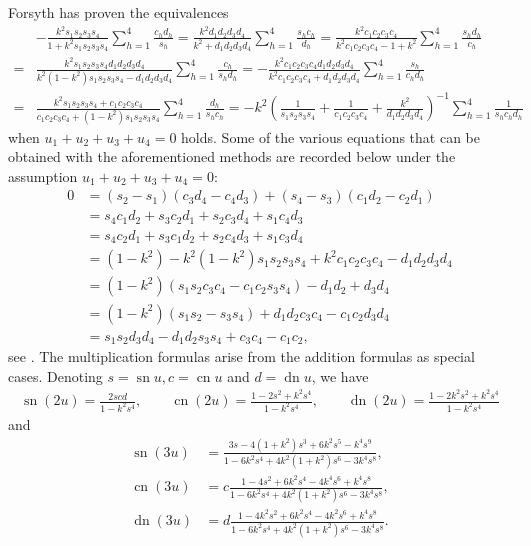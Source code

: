\documentclass{amsart}
\theoremstyle{definition}
\DeclareMathOperator{\dn}{dn}
\DeclareMathOperator{\sn}{sn}
\DeclareMathOperator{\cn}{cn}
\begin{document}
Forsyth \cite{forsythE} has proven the equivalences
\begin{align*}
    &-\frac{k^2s_1s_2s_3s_4}{1+k^2s_1s_2s_3s_4}\sum_{h=1}^4\frac{c_hd_h}{s_h}=\frac{k^2d_1d_2d_3d_4}{k^2+d_1d_2d_3d_4}\sum_{h=1}^{4}\frac{s_hc_h}{d_h}=\frac{k^2c_1c_2c_3c_4}{k^2c_1c_2c_3c_4-1+k^2}\sum_{h=1}^4\frac{s_hd_h}{c_h}\\
=&\frac{k^2s_1s_2s_3s_4d_1d_2d_3d_4}{k^2\left(1-k^2\right)s_1s_2s_3s_4-d_1d_2d_3d_4}\sum_{h=1}^4\frac{c_h}{s_hd_h}=-\frac{k^2c_1c_2c_3c_4d_1d_2d_3d_4}{k^2c_1c_2c_3c_4+d_1d_2d_3d_4}\sum_{h=1}^4\frac{s_h}{c_hd_h}\\
=&\frac{k^2s_1s_2s_3s_4+c_1c_2c_3c_4}{c_1c_2c_3c_4+\left( 1-k^2 \right)s_1s_2s_3s_4}\sum_{h=1}^4\frac{d_h}{s_hc_h}
=-k^2\left( \frac{1}{s_1s_2s_3s_4}+\frac{1}{c_1c_2c_3c_4}+\frac{k^2}{d_1d_2d_3d_4} \right)^{-1}\sum_{h=1}^{4}\frac{1}{s_hc_hd_h}
\end{align*}
when $u_1+u_2+u_3+u_4=0$ holds. Some of the various equations that can be obtained with the aforementioned methods are recorded below under the assumption $u_1+u_2+u_3+u_4=0$:
\begin{align*}
    0&=(s_2-s_1)(c_3d_4-c_4d_3)+(s_4-s_3)(c_1d_2-c_2d_1)\\
&=s_4c_1d_2+s_3c_2d_1+s_2c_3d_4+s_1c_4d_3\\
&=s_4c_2d_1+s_3c_1d_2+s_2c_4d_3+s_1c_3d_4\\
&=\left(1-k^2\right)-k^2\left(1-k^2\right)s_1s_2s_3s_4+k^2c_1c_2c_3c_4-d_1d_2d_3d_4\\
&=\left( 1-k^2 \right)\left( s_1s_2c_3c_4-c_1c_2s_3s_4 \right)-d_1d_2+d_3d_4\\
&=\left( 1-k^2 \right)\left( s_1s_2-s_3s_4 \right)+d_1d_2c_3c_4-c_1c_2d_3d_4\\
&=s_1s_2d_3d_4-d_1d_2s_3s_4+c_3c_4-c_1c_2,
\end{align*}
see \cite{forsythadd,Gudermann,Smith}. The multiplication formulas arise from the addition formulas as special cases. Denoting $s=\sn u, c=\cn u$ and $d=\dn u$, we have
\begin{align*}
    \sn(2u)=\frac{2scd}{1-k^2s^4}, \qquad \cn(2u)=\frac{1-2s^2+k^2s^4}{1-k^2s^4}, \qquad \dn(2u)=\frac{1-2k^2s^2+k^2s^4}{1-k^2s^4}
\end{align*}
and
\begin{align*}
    \sn(3u)&=\frac{3s-4\left( 1+k^2 \right)s^3+6k^2s^5 -k^4s^9}{1-6k^2s^4+4k^2\left( 1+k^2 \right)s^6-3k^4s^8},\\
\cn(3u)&=c\frac{1-4s^2+6k^2s^4-4k^4s^6+k^4s^8}{1-6k^2s^4+4k^2\left( 1+k^2 \right)s^6-3k^4s^8},\\
\dn(3u)&=d\frac{1-4k^2s^2+6k^2s^4-4k^2s^6+k^4s^8}{1-6k^2s^4+4k^2\left( 1+k^2 \right)s^6-3k^4s^8}.
\end{align*}
\end{document}
